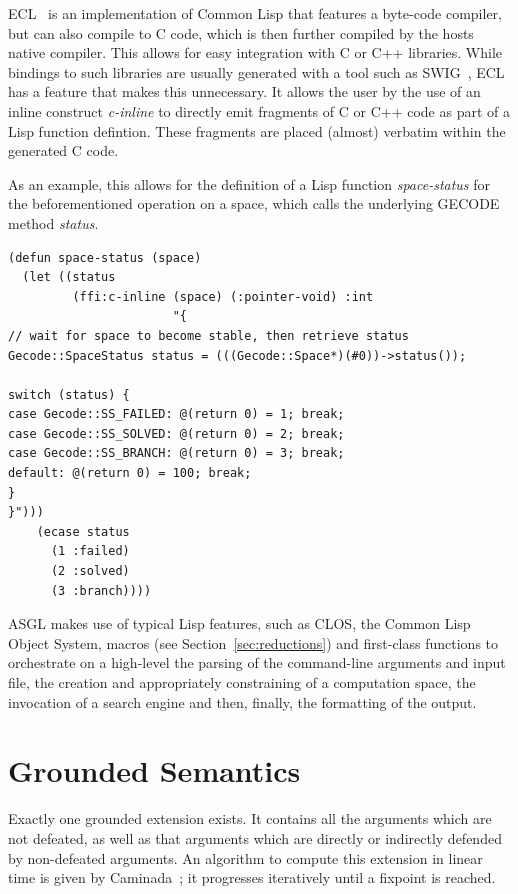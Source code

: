 \documentclass[runningheads,a4paper]{llncs}
\begin{document}
ECL~\cite{ecl} is an implementation of Common Lisp that features a
byte-code compiler, but can also compile to C code, which is then
further compiled by the hosts native compiler. This allows for easy
integration with C or C++ libraries. While bindings to such libraries
are usually generated with a tool such as SWIG~\cite{swig}, ECL has a
feature that makes this unnecessary. It allows the user by the use of
an inline construct \textit{c-inline} to directly emit fragments of C
or C++ code as part of a Lisp function defintion. These fragments are
placed (almost) verbatim within the generated C code.

As an example, this allows for the definition of a Lisp function
\textit{space-status} for the beforementioned operation on a space,
which calls the underlying GECODE method \textit{status}.

\begin{scriptsize}
\begin{verbatim}
(defun space-status (space)
  (let ((status
         (ffi:c-inline (space) (:pointer-void) :int
                       "{
// wait for space to become stable, then retrieve status
Gecode::SpaceStatus status = (((Gecode::Space*)(#0))->status());

switch (status) {
case Gecode::SS_FAILED: @(return 0) = 1; break;
case Gecode::SS_SOLVED: @(return 0) = 2; break;
case Gecode::SS_BRANCH: @(return 0) = 3; break;
default: @(return 0) = 100; break;
}
}")))
    (ecase status
      (1 :failed)
      (2 :solved)
      (3 :branch))))
\end{verbatim}
\end{scriptsize}

ASGL makes use of typical Lisp features, such as CLOS, the Common Lisp
Object System, macros (see Section~\ref{sec:reductions}) and
first-class functions to orchestrate on a high-level the parsing of
the command-line arguments and input file, the creation and
appropriately constraining of a computation space, the invocation of a
search engine and then, finally, the formatting of the output.

\section{Grounded Semantics}\label{sec:grounded}

Exactly one grounded extension exists. It contains all the arguments
which are not defeated, as well as that arguments which are directly
or indirectly defended by non-defeated arguments. An algorithm to
compute this extension in linear time is given by
Caminada~\cite{Modgil2009}; it progresses iteratively until a fixpoint
is reached.
\end{document}

